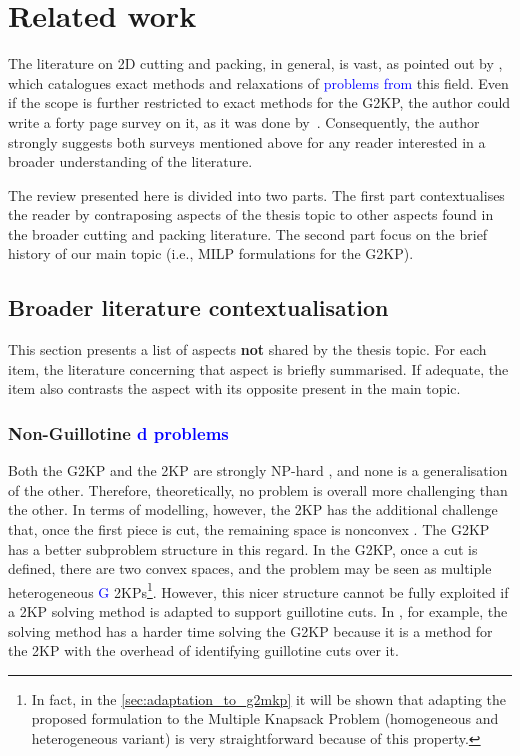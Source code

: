 \documentclass[ppgc,tese,english,formais,babel]{iiufrgs}
\newif\iffinalversion
\newcommand{\newtext}[1]{\iffinalversion%
#1%
\else%
\textcolor{blue}{#1}%
\fi%
}
\begin{document}
\chapter{Related work}
\label{sec:related_work}

The literature on 2D cutting and packing, in general, is vast, as pointed out by \citet{iori:2020}, which catalogues exact methods and relaxations of \newtext{problems from} this field.
Even if the scope is further restricted to exact methods for the G2KP, the author could write a forty page survey on it, as it was done by~\citet{russo:2020}.
Consequently, the author strongly suggests both surveys mentioned above for any reader interested in a broader understanding of the literature.

The review presented here is divided into two parts. The first part contextualises the reader by contraposing aspects of the thesis topic to other aspects found in the broader cutting and packing literature. The second part focus on the brief history of our main topic (i.e., MILP formulations for the G2KP).

\section{Broader literature contextualisation}

This section presents a list of aspects \textbf{not} shared by the thesis topic.
For each item, the literature concerning that aspect is briefly summarised.
If adequate, the item also contrasts the aspect with its opposite present in the main topic.

\subsection{Non-Guillotine\newtext{d problems}}

Both the G2KP and the 2KP are strongly NP-hard \citep{iori:2020}, and none is a generalisation of the other.
Therefore, theoretically, no problem is overall more challenging than the other.
In terms of modelling, however, the 2KP has the additional challenge that, once the first piece is cut, the remaining space is nonconvex \citep{fekete:1997}.
The G2KP has a better subproblem structure in this regard.
In the G2KP, once a cut is defined, there are two convex spaces, and the problem may be seen as multiple heterogeneous \newtext{G}2KPs\footnote{In fact, in the \cref{sec:adaptation_to_g2mkp} it will be shown that adapting the proposed formulation to the Multiple Knapsack Problem (homogeneous and heterogeneous variant) is very straightforward because of this property.}.
However, this nicer structure cannot be fully exploited if a 2KP solving method is adapted to support guillotine cuts.
In \citet{nascimento:2019}, for example, the solving method has a harder time solving the G2KP because it is a method for the 2KP with the overhead of identifying guillotine cuts over it.
\end{document}
